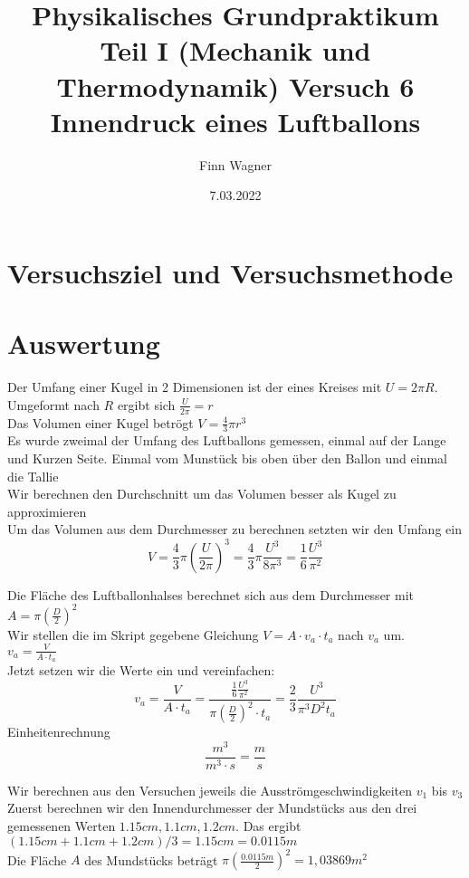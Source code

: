 \documentclass{article}
\date{7.03.2022}
\title{Physikalisches Grundpraktikum Teil I (Mechanik und Thermodynamik) Versuch 6 Innendruck eines Luftballons}
\author{Finn Wagner}
\begin{document}
    \maketitle

    \section{Versuchsziel und Versuchsmethode}

    \section{Auswertung}
    Der Umfang einer Kugel in 2 Dimensionen ist der eines Kreises mit \(U = 2 \pi R\). \\
    Umgeformt nach \(R\) ergibt sich \(\frac{U}{2 \pi} = r\) \\
    Das Volumen einer Kugel betrögt \( V = \frac{4}{3} \pi r^3 \) \\
    Es wurde zweimal der Umfang des Luftballons gemessen, einmal auf der Lange und Kurzen Seite.
    Einmal vom Munstück bis oben über den Ballon und einmal die Tallie \\
    Wir berechnen den Durchschnitt um das Volumen besser als Kugel zu approximieren \\
    Um das Volumen aus dem Durchmesser zu berechnen setzten wir den Umfang ein \\
    \[ V = \frac{4}{3} \pi {\left( \frac{U}{2 \pi} \right) }^3 = \frac{4}{3} \pi \frac{U^3}{8 \pi^3} = \frac{1}{6} \frac{U^3}{\pi^2}\]

    Die Fläche des Luftballonhalses berechnet sich aus dem Durchmesser mit \\
    \( A = \pi {\left(\frac{D}{2}\right)}^2 \) \\
    Wir stellen die im Skript gegebene Gleichung \( V = A \cdot v_a \cdot t_a \)
    nach \(v_a\) um. \\
    \( v_a = \frac{V}{A \cdot t_a} \) \\
    Jetzt setzen wir die Werte ein und vereinfachen:
    \[ v_a = \frac{V}{A \cdot t_a} = \frac{\frac{1}{6} \frac{U^3}{\pi^2} }{ \pi {\left(\frac{D}{2}\right)}^2 \cdot t_a} = \frac{2}{3} \frac{U^3}{\pi^3 D^2 t_a} \]
    Einheitenrechnung \\
    \[ \frac{m^3}{m^3 \cdot s} = \frac{m}{s}\]

    Wir berechnen aus den Versuchen jeweils die Ausströmgeschwindigkeiten \(v_1\) bis \(v_3\) \\
    Zuerst berechnen wir den Innendurchmesser der Mundstücks aus den drei gemessenen Werten
    \(1.15cm, 1.1cm, 1.2cm\). Das ergibt \( (1.15cm + 1.1cm + 1.2cm)/3 = 1.15cm = 0.0115m \) \\
    Die Fläche \(A\) des Mundstücks beträgt \( \pi {\left(\frac{0.0115m}{2}\right)}^2 = 1,03869m^2\)
\end{document}
